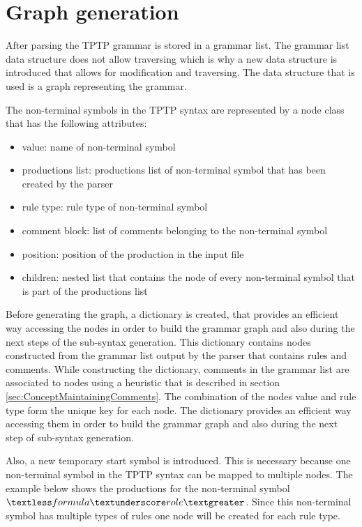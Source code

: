 \section{Graph generation}\label{sec:ConceptGraphGeneration}
After parsing the \ac{TPTP} grammar is stored in a grammar list. The grammar list data structure does not allow traversing which is why a new data structure is introduced that allows for modification and traversing.
The data structure that is used is a graph representing the grammar.

The non-terminal symbols in the \ac{TPTP} syntax are represented by a node class that has the following attributes:
\begin{itemize}
\item value: name of non-terminal symbol
\item productions list: productions list of non-terminal symbol that has been created by the parser
\item rule type: rule type of non-terminal symbol
\item comment block: list of comments belonging to the non-terminal symbol
\item position: position of the production in the input file
\item children: nested list that contains the node of every non-terminal symbol that is part of the productions list
\end{itemize}

Before generating the graph, a dictionary is created, that provides an efficient way accessing the nodes in order to build the grammar graph and also during the next steps of the sub-syntax generation.
This dictionary contains nodes constructed from the grammar list output by the parser that contains rules and comments.
While constructing the dictionary, comments in the grammar list are associated to nodes using a heuristic that is described in section \ref{sec:ConceptMaintainingComments}.
The combination of the nodes value and rule type form the unique key for each node.
The dictionary provides an efficient way accessing them in order to build the grammar graph and also during the next step of sub-syntax generation.

Also, a new temporary start symbol is introduced.
This is necessary because one non-terminal symbol in the \ac{TPTP} syntax can be mapped to multiple nodes.
The example below shows the productions for the non-terminal symbol $\textless formula\textunderscore role\textgreater$.
Since this non-terminal symbol has multiple types of rules one node will be created for each rule type.

